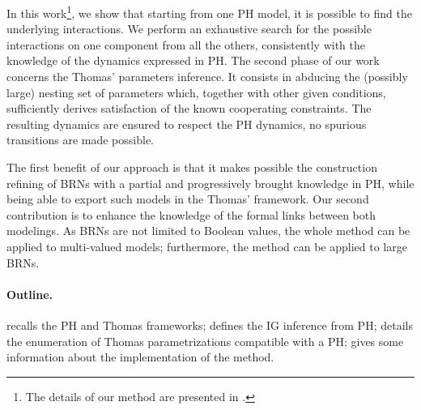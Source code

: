 In this work\footnote{The details of our method are presented in \cite{FPIMR12-CMSB}.}, we show that starting from one PH model, it is possible to find the underlying interactions.
We perform an exhaustive search for the possible interactions on one component from all the
others, consistently with the knowledge of the dynamics expressed in PH.
The second phase of our work concerns the Thomas' parameters inference.
It consists in abducing the (possibly large) nesting set of parameters which, together with other given conditions, sufficiently derives satisfaction of the known cooperating constraints.
The resulting dynamics are ensured to respect the PH dynamics, \ie no spurious transitions are
made possible.

The first benefit of our approach is that it makes possible the construction refining of BRNs with a partial and progressively brought knowledge in PH, while being able to export such models in the Thomas' framework.
Our second contribution is to enhance the knowledge of the formal links between both modelings.
As BRNs are not limited to Boolean values, the whole method can be applied to multi-valued models;
furthermore, the method can be applied to large BRNs.

\paragraph{Outline.}
 recalls the PH and Thomas frameworks;
 defines the IG inference from PH;
 details the enumeration of Thomas parametrizations compatible with a PH;
 gives some information about the implementation of the method.
